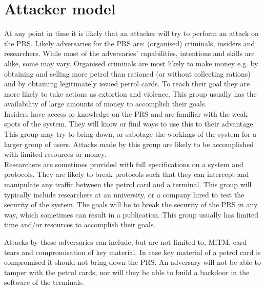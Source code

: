 \section{Attacker model}
At any point in time it is likely that an attacker will try to perform an attack on the PRS. Likely adversaries for the PRS are: (organised) criminals, insiders and researchers. While most of the adversaries' capabilities, intentions and skills are alike, some may vary. Organised criminals are most likely to make money e.g. by obtaining and selling more petrol than rationed (or without collecting rations) and by obtaining legitimately issued petrol cards. To reach their goal they are more likely to take actions as extortion and violence. This group usually has the availability of large amounts of money to accomplish their goals. \\

Insiders have access or knowledge on the PRS and are familiar with the weak spots of the system. They will know or find ways to use this to their advantage. This group may try to bring down, or sabotage the workings of the system for a larger group of users. Attacks made by this group are likely to be accomplished with limited resources or money.  \\

Researchers are sometimes provided with full specifications on a system and  protocols. They are likely to break protocols such that they can intercept and manipulate any traffic between the petrol card and a terminal. This group will typically include researchers at an university, or a company hired to test the security of the system. The goals will be to break the security of the PRS in any way, which sometimes can result in a publication. This group usually has limited time and/or resources to accomplish their goals. 

Attacks by these adversaries can include, but are not limited to, MiTM, card tears and compromisation of key material. In case key material of a petrol card is compromised it should not bring down the PRS. An adversary will not be able to tamper with the petrol cards, nor will they be able to build a backdoor in the software of the terminals. 



